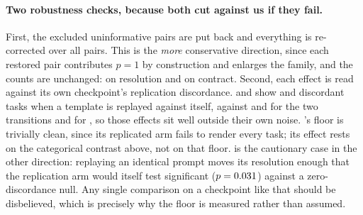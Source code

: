 \paragraph{Two robustness checks, because both cut against us if they fail.} First, the excluded
uninformative pairs are put back and everything is re-corrected over all \NAllPairs{} pairs. This is
the \emph{more} conservative direction, since each restored pair contributes $p=1$ by construction
and enlarges the family, and the counts are unchanged: \NAllSigRes{} on resolution and
\NAllSigCon{} on contract. Second, each effect is read against its own checkpoint's replication
discordance. \ShortPhi{} and \ShortMistral{} show \FloorDiscPhi{} and \FloorDiscMistral{}
discordant tasks when a
template is replayed against itself, against \PhiDiscDown{} and \PhiDiscUp{} for the two \ShortPhi{}
transitions and \MistralDisc{} for \ShortMistral{}, so those effects sit well outside their own
noise. \ShortMistral's floor is trivially clean, since its replicated arm fails to render every
task; its effect rests on the categorical contrast above, not on that floor. \ShortQwen{} is the cautionary case in the other direction: replaying an identical prompt
moves its resolution enough that the replication arm would itself test significant
($p=0.031$) against a zero-discordance null. Any single comparison on a checkpoint like that
should be disbelieved, which is precisely why the floor is measured rather than assumed.
